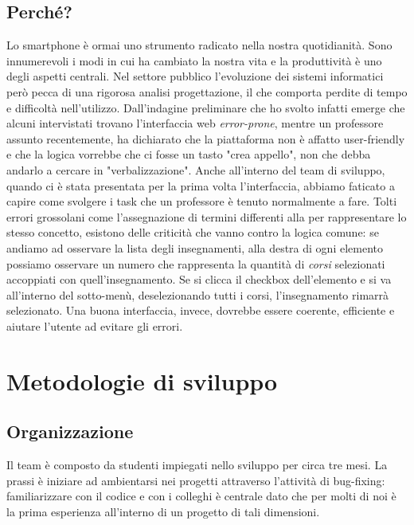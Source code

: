 \documentclass[Lau, oneside, noexaminfo]{sapthesis}%
\begin{document}
\section{Perché?}
\label{sec:why}
Lo smartphone è ormai uno strumento radicato nella nostra quotidianità. Sono innumerevoli i modi in cui ha cambiato la nostra vita e la produttività è uno degli aspetti centrali. Nel settore pubblico l'evoluzione dei sistemi informatici però pecca di una rigorosa analisi progettazione, il che comporta perdite di tempo e difficoltà nell'utilizzo. Dall'indagine preliminare che ho svolto infatti emerge che alcuni intervistati trovano l'interfaccia web \textit{error-prone}, mentre un professore assunto recentemente, ha dichiarato che la piattaforma non è affatto user-friendly e che la logica vorrebbe che ci fosse un tasto "crea appello", non che debba andarlo a cercare in "verbalizzazione". Anche all'interno del team di sviluppo, quando ci è stata presentata per la prima volta l'interfaccia, abbiamo faticato a capire come svolgere i task che un professore è tenuto normalmente a fare. Tolti errori grossolani come l'assegnazione di termini differenti alla per rappresentare lo stesso concetto, esistono delle criticità che vanno contro la logica comune: se andiamo ad osservare la lista degli insegnamenti, alla destra di ogni elemento possiamo osservare un numero che rappresenta la quantità di \textit{corsi} selezionati accoppiati con quell'insegnamento. Se si clicca il checkbox dell'elemento e si va all'interno del sotto-menù, deselezionando tutti i corsi, l'insegnamento rimarrà selezionato. Una buona interfaccia, invece, dovrebbe essere coerente, efficiente e aiutare l'utente ad evitare gli errori.


\chapter{Metodologie di sviluppo}
\label{ch:2}

\section{Organizzazione}
\label{sec:team}
Il team è composto da studenti impiegati nello sviluppo per circa tre mesi. La prassi è iniziare ad ambientarsi nei progetti attraverso l'attività di bug-fixing: familiarizzare con il codice e con i colleghi è centrale dato che per molti di noi è la prima esperienza all'interno di un progetto di tali dimensioni.
\end{document}
